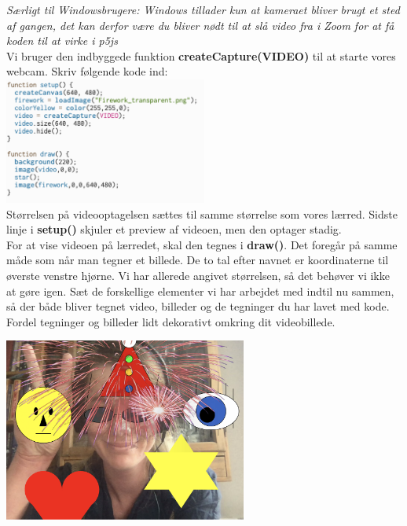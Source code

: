\documentclass{ucph-handout}
\begin{document}
\newpage

\begin{exercisebox}[adjusted title=Video]
\textit{Særligt til Windowsbrugere: Windows tillader kun at kameraet bliver brugt et sted af gangen, det kan derfor være du bliver nødt til at slå video fra i Zoom for at få koden til at virke i p5js}\\

Vi bruger den indbyggede funktion \textbf{createCapture(VIDEO)} til at starte vores webcam. Skriv følgende kode ind: \\

\quad\includegraphics[width=0.5\textwidth]{nyebilleder/vidoeplus.png} \\

Størrelsen på videooptagelsen sættes til samme størrelse som vores lærred. Sidste linje i \textbf{setup()} skjuler et preview af videoen, men den optager stadig.\\

For at vise videoen på lærredet, skal den tegnes i \textbf{draw()}. Det foregår på samme måde som når man tegner et billede. De to tal efter navnet er koordinaterne til øverste venstre hjørne. Vi har allerede angivet størrelsen, så det behøver vi ikke at gøre igen.
\vspace{3mm}
\vspace{3mm}
Sæt de forskellige elementer vi har arbejdet med indtil nu sammen, så der både bliver tegnet video, billeder og de tegninger du har lavet med kode. Fordel tegninger og billeder lidt dekorativt omkring dit videobillede. 

\begin{center}
\includegraphics[width=0.6\textwidth]{nyebilleder/coolpi.png}
\end{center}
\end{exercisebox}
\end{document}
